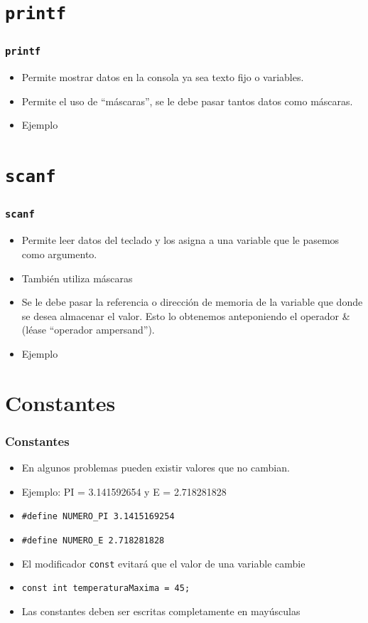 \documentclass[handout]{beamer}
\begin{document}
\section{\texttt{printf}} %
\label{sec:printf}
\begin{frame}[t]\frametitle{\texttt{printf}}
    \begin{itemize}
      \item Permite mostrar datos en la consola ya sea texto fijo o variables.
      \item Permite el uso de ``máscaras'', se le debe pasar tantos datos como máscaras.
      \item Ejemplo 
    \end{itemize}
\end{frame}

\section{\texttt{scanf}} %
\label{sec:scanf}
\begin{frame}[t]\frametitle{\texttt{scanf}}
    \begin{itemize}
      \item Permite leer datos del teclado y los asigna a una variable que le pasemos como argumento.
      \item También utiliza máscaras
      \item Se le debe pasar la referencia o dirección de memoria de la variable que donde se desea almacenar el valor. Esto lo obtenemos anteponiendo el operador \& (léase “operador ampersand”).
      \item Ejemplo 
    \end{itemize}
\end{frame}

\section{Constantes} %
\label{sec:constantes}
\begin{frame}[t]\frametitle{Constantes}
    \begin{itemize}
      \item En algunos problemas pueden existir valores que no cambian.
      \item Ejemplo: PI = 3.141592654 y E = 2.718281828
      \item \texttt{\#define NUMERO\_PI 3.1415169254}
      \item \texttt{\#define NUMERO\_E 2.718281828}
      \item El modificador \texttt{const} evitará que el valor de una variable cambie 
      \item \texttt{const int temperaturaMaxima = 45;}
      \item Las constantes deben ser escritas completamente en mayúsculas

    \end{itemize}
\end{frame}
\end{document}
